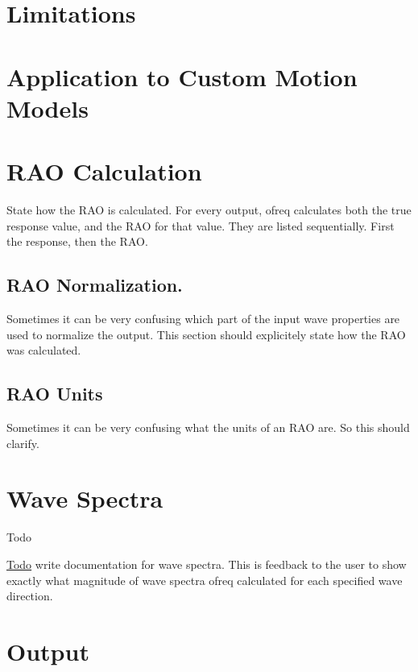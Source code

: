 \section*{Limitations}

\section*{Application to Custom Motion Models}

\section*{R\-A\-O Calculation}

State how the R\-A\-O is calculated. For every output, ofreq calculates both the true response value, and the R\-A\-O for that value. They are listed sequentially. First the response, then the R\-A\-O.

\subsection*{R\-A\-O Normalization.}

Sometimes it can be very confusing which part of the input wave properties are used to normalize the output. This section should explicitely state how the R\-A\-O was calculated.

\subsection*{R\-A\-O Units}

Sometimes it can be very confusing what the units of an R\-A\-O are. So this should clarify. \hypertarget{output_wave_spectra}{}\section{Wave Spectra}\label{output_wave_spectra}
\begin{DoxyRefDesc}{Todo}
\item[\hyperlink{todo__todo000027}{Todo}]write documentation for wave spectra. This is feedback to the user to show exactly what magnitude of wave spectra ofreq calculated for each specified wave direction.\end{DoxyRefDesc}


\section*{Output}

